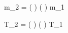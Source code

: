 m_2 = \left(  \right) \times \left(  \right) \times m_1

T_2 = \left(  \right) \times \left(  \right) \times T_1


